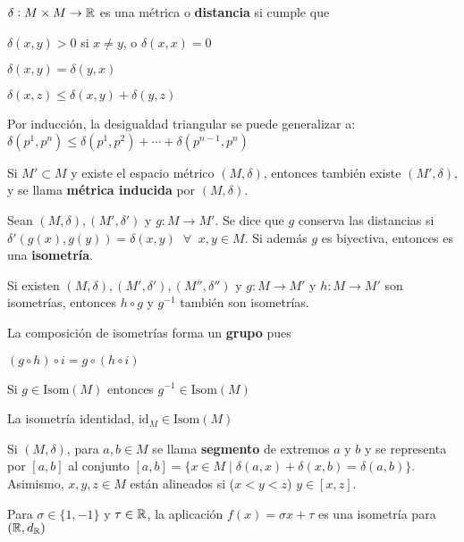 
	 $\delta: M \times M \rightarrow \mathbb{R} $ es una métrica o \textbf{distancia} si cumple que 
	\begin{itemizex}
		\item $\delta(x,y) > 0$ si $x \neq y$, o $\delta(x,x) = 0$
		\item $\delta(x,y) = \delta(y,x)$
		\item $\delta(x,z) \le \delta(x,y) + \delta(y,z)$
	\end{itemizex}
	
	 Por inducción, la desigualdad triangular se puede generalizar a: $\delta(p^1, p^n) \le \delta(p^1, p^2) + \cdots + \delta(p^{n-1}, p^n)$
	
	 Si $M' \subset M$ y existe el espacio métrico $(M, \delta)$, entonces también existe $(M', \delta)$, y se llama \textbf{métrica inducida} por $(M,\delta)$.
	
	 Sean $(M,\delta), (M', \delta')$ y $g: M \rightarrow M'$. Se dice que $g$ conserva las distancias si $\delta'(g(x), g(y)) = \delta(x, y)\;\; \forall \; \; x,y \in M$. Si además $g$ es biyectiva, entonces es una \textbf{isometría}.
	
	 Si existen $(M, \delta), (M', \delta'), (M'', \delta'')$ y $g: M\rightarrow M'$ y $h: M\rightarrow M'$ son isometrías, entonces $h\circ g$ y $g^{-1}$ también son isometrías.
	
	 La composición de isometrías forma un \textbf{grupo} pues
	\begin{itemizex}
		\item $(g \circ h) \circ i = g \circ (h \circ i)$
		\item Si $g \in \text{Isom}(M)$ entonces $g^{-1} \in \text{Isom}(M)$
		\item La isometría identidad, $\text{id}_M \in \text{Isom}(M)$
	\end{itemizex}
	
	 Si $(M, \delta)$, para $a,b \in M$ se llama \textbf{segmento} de extremos $a$ y $b$ y se representa por $[a,b]$ al conjunto $[a,b] = \{x \in M \;|\; \delta(a,x) + \delta(x,b) = \delta(a,b) \}$. Asimismo, $x,y,z \in M$ están alineados si ($x < y < z$) $y \in [x,z]$.	 
	
	 Para $\sigma \in \{1,-1\}$ y $\tau \in \mathbb{R}$, la aplicación $f(x) = \sigma x+\tau$ es una isometría para $(\mathbb{R}, d_{\mathbb{R}})$
	

	 
	 
	 
	 
	 
	 
	 